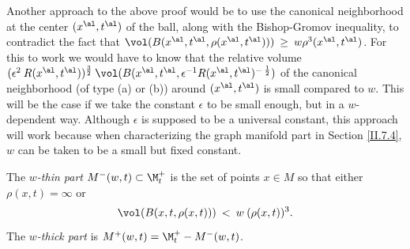 \begin{remark}
  \label{rem:kl-thick-thin-decomposition-estimates-canonical-neighborhoods}

Another approach to the above proof  would be to use the
canonical neighborhood at the center $(x^\al, t^\al)$ of the ball,
along with the Bishop-Gromov
inequality, to contradict the fact that
$\vol(B(x^\al, t^\al, \rho(x^\al, t^\al))) \: \ge \: w \rho^3(x^\al, t^\al)$. For this
to work we would have to know that the relative volume
$(\epsilon^{2} \: R(x^\al, t^\al))^{\frac32} \:  \vol(B(x^\al, t^\al, \epsilon^{-1}
R(x^\al, t^\al)^{- \: \frac12})$ of the canonical neighborhood (of
type (a) or (b)) around $(x^\al, t^\al)$ is small compared to $w$.
This will be the case if we take the constant $\epsilon$ to
be small enough, but in a $w$-dependent way.  Although $\epsilon$ is supposed
to be a universal constant, this approach will work because when
characterizing the graph manifold part in Section \ref{II.7.4}, $w$ can be taken to be a
small but fixed constant.
\end{remark}

\begin{definition}
  \label{def:kl-thick-thin-decomposition-thick-thin-decomposition}

The {\em $w$-thin part} $M^-(w, t) \subset \M_t^+$ is the set of points
$x \in M$ so that either $\rho(x,t)=\infty$ or
\begin{equation}
\vol(B(x, t, \rho(x, t))) \: < \: w \:
(\rho(x, t))^3.
\end{equation}
The {\em $w$-thick part} is $M^+(w, t) = \M_t^+  - M^-(w, t)$.
\end{definition}

